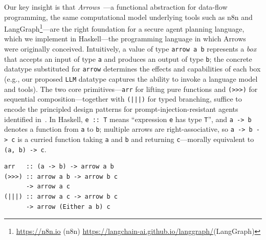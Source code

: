 \documentclass{kaw}
\begin{document}
%
Our key insight is that \emph{Arrows}~\cite{hughes:generalising-monads-arrows}---a
functional abstraction for data-flow programming, the same computational model
underlying tools such as n8n and
LangGraph\footnote{\tiny \url{https://n8n.io} (n8n)
\url{https://langchain-ai.github.io/langgraph/}(LangGraph)}---are the right
foundation for a secure agent planning language, which we implement in
Haskell---the programming language in which Arrows were originally conceived.
%
%
Intuitively, a value of type \texttt{arrow a b} represents a
\emph{box} that accepts an input of type \texttt{a} and produces
an output of type \texttt{b}; the concrete datatype substituted
for \texttt{arrow} determines the effects and capabilities of each
box (e.g., our proposed \texttt{LLM} datatype captures the
ability to invoke a language model and tools).
%
The two core primitives---\texttt{arr} for lifting pure
functions and \texttt{(>>>)} for sequential
composition---together with \texttt{(|||)} for typed branching,
suffice to encode the principled design patterns for prompt-injection-resistant
agents identified in~\cite{BeurerKellner:Patterns25}.
%
In Haskell, \texttt{e :: T} means ``expression \texttt{e} has
type \texttt{T}'', and \texttt{a -> b} denotes a function from
\texttt{a} to \texttt{b}; multiple arrows are right-associative, so
\texttt{a -> b -> c} is a curried function taking \texttt{a} and
\texttt{b} and returning \texttt{c}---morally equivalent to
\texttt{(a, b) -> c}.
%
\begin{verbatim}
arr   :: (a -> b) -> arrow a b
(>>>) :: arrow a b -> arrow b c
      -> arrow a c
(|||) :: arrow a c -> arrow b c
      -> arrow (Either a b) c
\end{verbatim}
\end{document}
